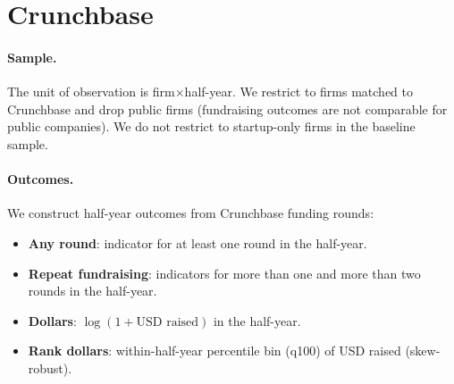 \documentclass{article}
\newcommand{\cleanedresultsdir}{../results/cleaned/tex}
\begin{document}
\thispagestyle{empty}

\section*{Crunchbase}

\paragraph{Sample.}
The unit of observation is firm$\times$half-year. We restrict to firms matched to Crunchbase and drop public firms
(fundraising outcomes are not comparable for public companies). We do not restrict to startup-only firms in the baseline sample.

\paragraph{Outcomes.}
We construct half-year outcomes from Crunchbase funding rounds:
\begin{itemize}
  \item \textbf{Any round}: indicator for at least one round in the half-year.
  \item \textbf{Repeat fundraising}: indicators for more than one and more than two rounds in the half-year.
  \item \textbf{Dollars}: $\log(1+\text{USD raised})$ in the half-year.
  \item \textbf{Rank dollars}: within-half-year percentile bin (q100) of USD raised (skew-robust).
\end{itemize}

\begin{table}[h!]
\caption{\textbf{Crunchbase Fundraising Outcomes (Baseline Sample: Private Firms)}}

\end{table}

\begin{table}[h!]
\caption{\textbf{Additional Outcomes: Rounds, Later-Stage Indicators, and Cumulative Robustness}}

\end{table}
\end{document}
